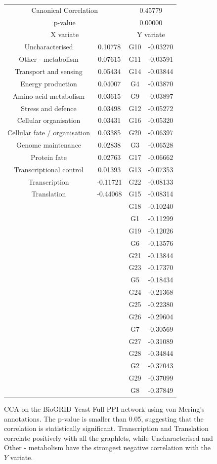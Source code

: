 \begin{figure}[H]
\centering
\begin{tabular}{ c c | c c }
  \multicolumn{2}{c}{Canonical Correlation} &  \multicolumn{2}{c}{0.45779} \\
  \multicolumn{2}{c}{p-value} &  \multicolumn{2}{c}{0.00000} \\
  \hline
  \multicolumn{2}{c}{X variate} & \multicolumn{2}{c}{Y variate}\\
  \hline
 Uncharacterised & 0.10778 &  G10 & -0.03270\\
 Other - metabolism & 0.07615 &  G11 & -0.03591\\
 Transport and sensing & 0.05434 &  G14 & -0.03844\\
 Energy production & 0.04007 &  G4 & -0.03870\\
 Amino acid metabolism & 0.03615 &  G9 & -0.03897\\
 Stress and defence & 0.03498 &  G12 & -0.05272\\
 Cellular organisation & 0.03431 &  G16 & -0.05320\\
 Cellular fate / organisation & 0.03385 &  G20 & -0.06397\\
 Genome maintenance & 0.02838 &  G3 & -0.06528\\
 Protein fate & 0.02763 &  G17 & -0.06662\\
 Transcriptional control & 0.01393 &  G13 & -0.07353\\
 Transcription & -0.11721 &  G22 & -0.08133\\
 Translation & -0.44068 &  G15 & -0.08314\\
 & &  G18 & -0.10240\\
 & &  G1 & -0.11299\\
 & &  G19 & -0.12026\\
 & &  G6 & -0.13576\\
 & &  G21 & -0.13844\\
 & &  G23 & -0.17370\\
 & &  G5 & -0.18434\\
 & &  G24 & -0.21368\\
 & &  G25 & -0.22380\\
 & &  G26 & -0.29604\\
 & &  G7 & -0.30569\\
 & &  G27 & -0.31089\\
 & &  G28 & -0.34844\\
 & &  G2 & -0.37043\\
 & &  G29 & -0.37099\\
 & &  G8 & -0.37849\\
\end{tabular}
\caption[CCA on the BioGRID Yeast Full PPI network -- von Mering's annotations]{CCA on the BioGRID Yeast Full PPI network using von Mering's annotations. The p-value is smaller than 0.05, suggesting that the correlation is statistically significant. Transcription and Translation correlate positively with all the graphlets, while Uncharacterised and Other - metabolism have the strongest negative correlation with the $Y$ variate.}
\label{all_ppi16}
\end{figure}


